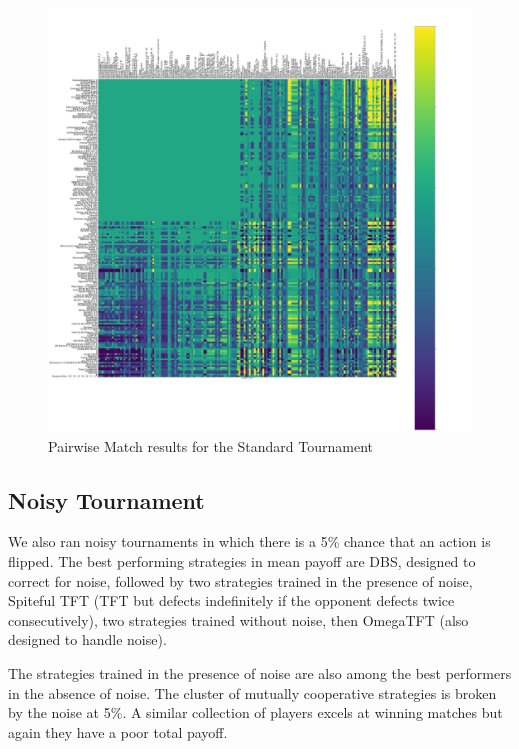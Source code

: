 \documentclass{article}
\begin{document}
\begin{figure}[!hbtp]
    \includegraphics[width=\paperwidth]{plots/Standard_payoff.pdf}
    \caption{Pairwise Match results for the Standard Tournament}
\end{figure}



\subsection{Noisy Tournament}

We also ran noisy tournaments in which there is a 5\% chance that an action
is flipped. The best performing strategies in mean payoff are DBS, designed
to correct for noise, followed by two strategies trained
in the presence of noise, Spiteful TFT (TFT but defects indefinitely if the
opponent defects twice consecutively), two strategies trained without noise, then
OmegaTFT (also designed to handle noise).

The strategies trained in the presence of noise are also among the best performers
in the absence of noise. The cluster of mutually cooperative strategies is
broken by the noise at 5\%. A similar collection of players excels at winning
matches but again they have a poor total payoff.
\end{document}
